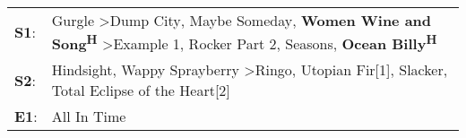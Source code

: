 \begin{supertabular}{p{0.03\textwidth}p{0.92\textwidth}}
 \textbf{S1}:  &  Gurgle\textsuperscript{} \textgreater \enspace Dump City\textsuperscript{}, \enspace Maybe Someday\textsuperscript{}, \enspace \textbf{Women Wine and Song\textsuperscript{H}} \textgreater \enspace Example 1\textsuperscript{}, \enspace Rocker Part 2\textsuperscript{}, \enspace Seasons\textsuperscript{}, \enspace \textbf{Ocean Billy\textsuperscript{H}}  \enspace  \\
 \textbf{S2}:  &                                                                                                   Hindsight\textsuperscript{}, \enspace Wappy Sprayberry\textsuperscript{} \textgreater \enspace Ringo\textsuperscript{}, \enspace Utopian Fir[1]\textsuperscript{}, \enspace Slacker\textsuperscript{}, \enspace Total Eclipse of the Heart[2]\textsuperscript{}  \enspace  \\
 \textbf{E1}:  &                                                                                                                                                                                                                                                                                                                                     All In Time\textsuperscript{}  \enspace  \\
\end{supertabular}
